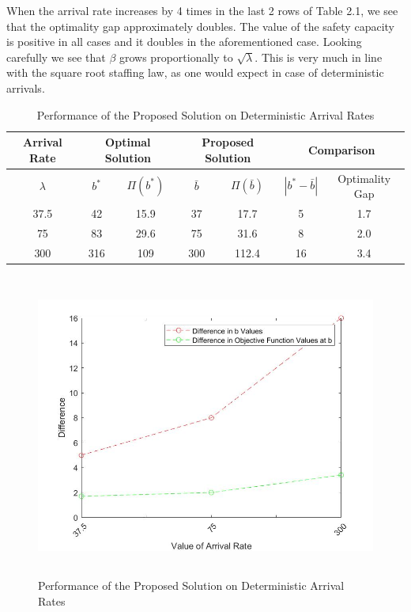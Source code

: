 \begin{remark}
When the arrival rate increases by 4 times in the last 2 rows of Table 2.1, we see that the optimality gap approximately doubles. The value of the safety capacity is positive in all cases and it doubles in the aforementioned case. Looking carefully we see that $\beta$ grows proportionally to $\sqrt{\lambda}$. This is very much in line with the square root staffing law, as one would expect in case of deterministic arrivals. 
\end{remark}
\begin{center}
\begin{table}[hbt!]
            \begin{tabular}{|c||c|c|c|c|c|c|}
            \hline
            Arrival Rate &  \multicolumn{2}{|c|}{Optimal Solution} & \multicolumn{2}{|c|}{Proposed Solution}& \multicolumn{2}{|c|}{Comparison} \\
            \hline
                $\lambda$& $b^*$ & $\Pi(b^*)$ & $\bar{b}$& $\Pi(\bar{b})$& $|b^*-\bar{b}|$& Optimality Gap\\ 
                    \hline \hline
                    37.5 & 42 & 15.9 & 37 & 17.7 & 5& 1.7\\
                    75 & 83 & 29.6 & 75 & 31.6 & 8& 2.0\\
                    300 & 316 & 109 & 300 & 112.4 & 16& 3.4\\
            \hline
            \end{tabular} 
            \caption{Performance of the Proposed Solution on Deterministic Arrival Rates}            
\end{table}

\begin{figure}[hbt!]
\includegraphics[height=10cm]{correctedDet.jpg}
\caption{Performance of the Proposed Solution on Deterministic Arrival Rates}
\end{figure}
\end{center}
